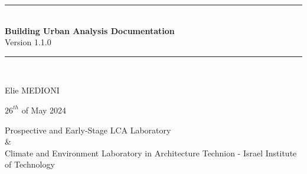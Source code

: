 \documentclass[a4paper,12pt]{article} %
\newcommand{\HRule}{\rule{\linewidth}{0.5mm}}
\begin{document}
    \begin{titlepage}
        \begin{sffamily}
            \begin{center}
                \HRule \\[0.4cm]
                { \huge \bfseries Building Urban Analysis Documentation \\[0.4cm] }
                \nopagebreak
                \large
                Version 1.1.0
                \HRule \\[1cm]

                \bigbreak
                \bigbreak


                \bigbreak
                \bigbreak



                \Large
                Elie MEDIONI \\
                \bigbreak

                \medbreak
                {\centerline{\large $26^{th}$ of May 2024}}
                \bigbreak
                {Prospective and Early-Stage LCA Laboratory}\\
                {\&}\\
                {Climate and Environment Laboratory in Architecture}
                \smallbreak
                \bigbreak
                {Technion - Israel Institute of Technology}
                \bigbreak



            \end{center}
        \end{sffamily}
    \end{titlepage}

    \newpage

    \renewcommand{\contentsname}{Table of contents}
    \tableofcontents
\end{document}
